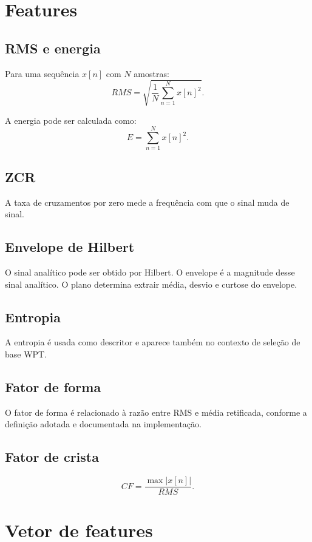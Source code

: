 \documentclass[12pt,a4paper]{article}
\begin{document}
\section{Features}

\subsection{RMS e energia}

Para uma sequência $x[n]$ com $N$ amostras:
\[
RMS=\sqrt{\frac{1}{N}\sum_{n=1}^{N}x[n]^2}.
\]

A energia pode ser calculada como:
\[
E=\sum_{n=1}^{N}x[n]^2.
\]

\subsection{ZCR}

A taxa de cruzamentos por zero mede a frequência com que o sinal muda de sinal.

\subsection{Envelope de Hilbert}

O sinal analítico pode ser obtido por Hilbert. O envelope é a magnitude desse sinal analítico. O plano determina extrair média, desvio e curtose do envelope.

\subsection{Entropia}

A entropia é usada como descritor e aparece também no contexto de seleção de base WPT.

\subsection{Fator de forma}

O fator de forma é relacionado à razão entre RMS e média retificada, conforme a definição adotada e documentada na implementação.

\subsection{Fator de crista}

\[
CF=\frac{\max |x[n]|}{RMS}.
\]

\section{Vetor de features}
\end{document}
